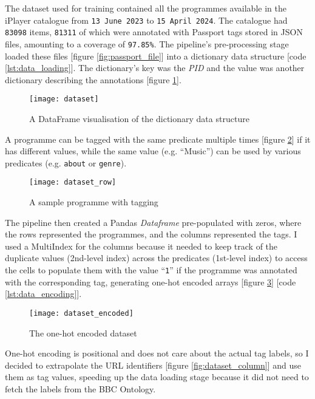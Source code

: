 
The dataset used for training contained all the programmes available in the iPlayer catalogue from \verb|13 June 2023| to \verb|15 April 2024|.
The catalogue had \verb|83098| items, \verb|81311| of which were annotated with Passport tags stored in JSON files, amounting to a coverage of \verb|97.85%|.
The pipeline's pre-processing stage loaded these files [figure \ref{fig:passport_file}] into a dictionary data structure [code \ref{lst:data_loading}].
The dictionary's key was the \textit{PID} and the value was another dictionary describing the annotations [figure \ref{fig:dataset}].

\begin{figure}[h]
  \centering
  \texttt{[image: dataset]}
  \caption{A DataFrame visualisation of the dictionary data structure}
  \label{fig:dataset}
\end{figure}

A programme can be tagged with the same predicate multiple times [figure \ref{fig:dataset_row}] if it has different values,
while the same value (e.g. ``Music'') can be used by various predicates (e.g. \verb|about| or \verb|genre|).

\begin{figure}[h]
  \centering
  \texttt{[image: dataset\_row]}
  \caption{A sample programme with tagging}
  \label{fig:dataset_row}
\end{figure}

The pipeline then created a Pandas \textit{Dataframe} pre-populated with zeros,
where the rows represented the programmes, and the columns represented the tags.
I used a MultiIndex \cite{Pandas:MultiIndex} for the columns because it needed to keep track of the duplicate values (2nd-level index)
across the predicates (1st-level index) to access the cells to populate them with the value ``\verb|1|''
if the programme was annotated with the corresponding tag, generating one-hot encoded arrays [figure \ref{fig:dataset_encoded}] [code \ref{lst:data_encoding}].

\begin{figure}[h]
  \centering
  \texttt{[image: dataset\_encoded]}
  \caption{The one-hot encoded dataset}
  \label{fig:dataset_encoded}
\end{figure}

One-hot encoding is positional and does not care about the actual tag labels,
so I decided to extrapolate the URL identifiers [figure \ref{fig:dataset_column}] and use them as tag values,
speeding up the data loading stage because it did not need to fetch the labels from the BBC Ontology.

